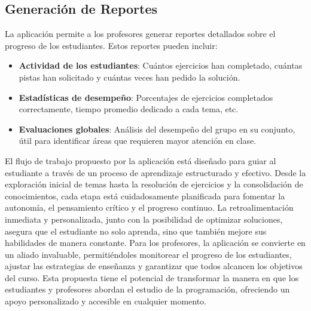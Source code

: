 \documentclass{article}
\begin{document}
\subsection{Generación de Reportes}
La aplicación permite a los profesores generar reportes detallados sobre el progreso de los estudiantes. Estos reportes pueden incluir:
\begin{itemize}
    \item \textbf{Actividad de los estudiantes}: Cuántos ejercicios han completado, cuántas pistas han solicitado y cuántas veces han pedido la solución.
    \item \textbf{Estadísticas de desempeño}: Porcentajes de ejercicios completados correctamente, tiempo promedio dedicado a cada tema, etc.
    \item \textbf{Evaluaciones globales}: Análisis del desempeño del grupo en su conjunto, útil para identificar áreas que requieren mayor atención en clase.
\end{itemize}


El flujo de trabajo propuesto por la aplicación está diseñado para guiar al estudiante a través de un proceso de aprendizaje estructurado y efectivo. Desde la exploración inicial de temas hasta la resolución de ejercicios y la consolidación de conocimientos, cada etapa está cuidadosamente planificada para fomentar la autonomía, el pensamiento crítico y el progreso continuo. La retroalimentación inmediata y personalizada, junto con la posibilidad de optimizar soluciones, asegura que el estudiante no solo aprenda, sino que también mejore sus habilidades de manera constante. Para los profesores, la aplicación se convierte en un aliado invaluable, permitiéndoles monitorear el progreso de los estudiantes, ajustar las estrategias de enseñanza y garantizar que todos alcancen los objetivos del curso. Esta propuesta tiene el potencial de transformar la manera en que los estudiantes y profesores abordan el estudio de la programación, ofreciendo un apoyo personalizado y accesible en cualquier momento.
\end{document}
